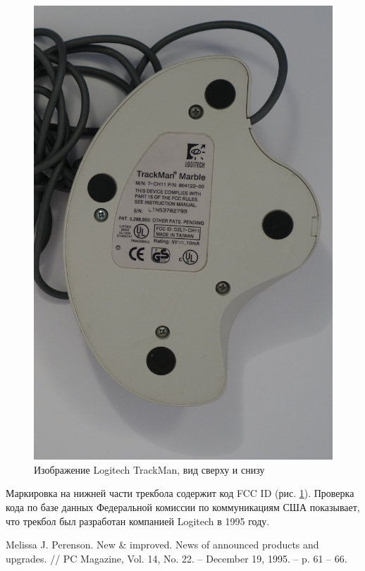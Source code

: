 \documentclass[11pt, a4paper]{article}
\begin{document}
\begin{figure}[h]
    \includegraphics[scale=0.5]{1995_logitech_trackman/2.17.JPG}
    \caption{Изображение Logitech TrackMan, вид сверху и снизу}
    \label{fig:trackmanTopAndBottom}
\end{figure}
    
    Маркировка на нижней части трекбола содержит код FCC ID (рис. \ref{fig:trackmanTopAndBottom}).
    Проверка кода по базе данных Федеральной комиссии по коммуникациям США показывает, что трекбол был разработан компанией Logitech в 1995 году.


\begin{thebibliography}[9]
 Melissa J. Perenson. New & improved. News of announced products and upgrades. // PC Magazine, Vol. 14, No. 22. -- December 19, 1995. -- p. 61 -- 66.
\end{thebibliography}
\end{document}
